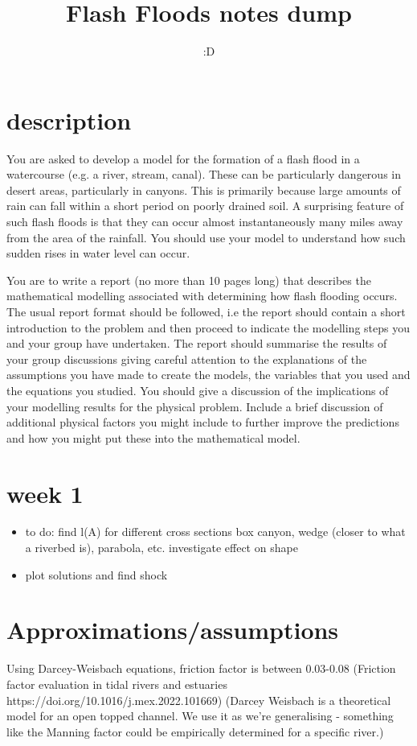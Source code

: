 \documentclass[12pt]{article}
\title{Flash Floods notes dump}
\author{:D}
\begin{document}
\maketitle
\section{description}
You are asked to develop a model for the formation of a flash flood in a watercourse (e.g.
a river, stream, canal). These can be particularly dangerous in desert areas, particularly in
canyons. This is primarily because large amounts of rain can fall within a short period on
poorly drained soil. A surprising feature of such flash floods is that they can occur almost
instantaneously many miles away from the area of the rainfall. You should use your model
to understand how such sudden rises in water level can occur.

You are to write a report (no more than 10 pages long) that describes the mathematical
modelling associated with determining how flash flooding occurs. The usual report format
should be followed, i.e the report should contain a short introduction to the problem and
then proceed to indicate the modelling steps you and your group have undertaken. The
report should summarise the results of your group discussions giving careful attention to the
explanations of the assumptions you have made to create the models, the variables that you
used and the equations you studied. You should give a discussion of the implications of your
modelling results for the physical problem. Include a brief discussion of additional physical
factors you might include to further improve the predictions and how you might put these
into the mathematical model.
\section{week 1}
\begin{itemize}
    \item to do: find l(A) for different cross sections
box canyon, wedge (closer to what a riverbed is), parabola, etc. investigate effect on shape
    \item plot solutions and find shock
\end{itemize}

\section{Approximations/assumptions}
Using Darcey-Weisbach equations, friction factor is between 0.03-0.08 (Friction factor evaluation in tidal rivers and estuaries https://doi.org/10.1016/j.mex.2022.101669)  (Darcey Weisbach is a theoretical model for an open topped channel. We use it as we're generalising - something like the Manning factor could be empirically determined for a specific river.)
\end{document}
